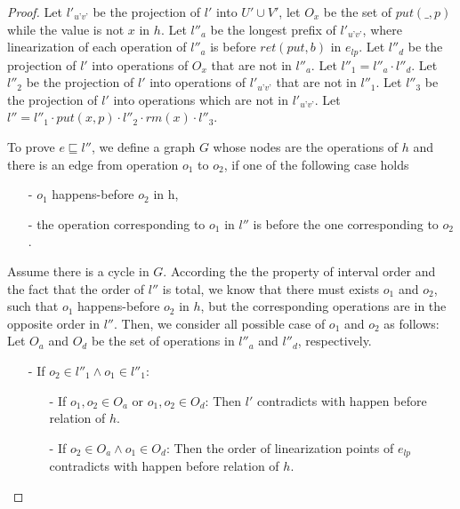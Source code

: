 \begin {proof}
Let $l'_{\textit{u'v'}}$ be the projection of $l'$ into $U' \cup V'$, let $O_x$ be the set of $\textit{put}(\_,p)$ while the value is not $x$ in $h$. Let $l''_a$ be the longest prefix of $l'_{\textit{u'v'}}$, where linearization of each operation of $l''_a$ is before $\textit{ret}(\textit{put},b)$ in $e_{\textit{lp}}$. Let $l''_d$ be the projection of $l'$ into operations of $O_x$ that are not in $l''_a$. Let $l''_1 = l''_a \cdot l''_d$. Let $l''_2$ be the projection of $l'$ into operations of $l'_{\textit{u'v'}}$ that are not in $l''_1$. Let $l''_3$ be the projection of $l'$ into operations which are not in $l'_{\textit{u'v'}}$. Let $l'' = l''_1 \cdot \textit{put}(x,p) \cdot l''_2 \cdot \textit{rm}(x) \cdot l''_3$.

To prove $e \sqsubseteq l''$, we define a graph $G$ whose nodes are the operations of $h$ and there is an edge from operation $o_1$ to $o_2$, if one of the following case holds

\begin{itemize}
\setlength{\itemsep}{0.5pt}
\item[-] $o_1$ happens-before $o_2$ in h,

\item[-] the operation corresponding to $o_1$ in $l''$ is before the one corresponding to $o_2$.
\end{itemize}

Assume there is a cycle in $G$. According the the property of interval order and the fact that the order of $l''$ is total, we know that there must exists $o_1$ and $o_2$, such that $o_1$ happens-before $o_2$ in $h$, but the corresponding operations are in the opposite order in $l''$. Then, we consider all possible case of $o_1$ and $o_2$ as follows: Let $O_a$ and $O_d$ be the set of operations in $l''_a$ and $l''_d$, respectively.

\begin{itemize}
\setlength{\itemsep}{0.5pt}
\item[-] If $o_2 \in l''_1 \wedge o_1 \in l''_1$:
    \begin{itemize}
    \setlength{\itemsep}{0.5pt}
    \item[-] If $o_1,o_2 \in O_a$ or $o_1,o_2 \in O_d$: Then $l'$ contradicts with happen before relation of $h$.

    \item[-] If $o_2 \in O_a \wedge o_1 \in O_d$: Then the order of linearization points of $e_{\textit{lp}}$ contradicts with happen before relation of $h$.
    \end{itemize}


\end{itemize}
\end{proof}
